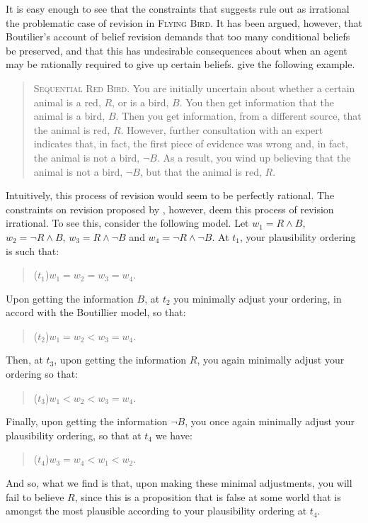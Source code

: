 It is easy enough to see that the constraints that \citet{Boutilier1} suggests rule out as irrational the problematic case of revision in \textsc{Flying Bird}.
It has been argued, however, that Boutilier's account of belief revision demands that too many conditional beliefs be preserved, and that this has undesirable consequences about when an agent may be rationally required to give up certain beliefs. \citet{DarwichePearle} give the following example.
\begin{quote}
\textsc{Sequential Red Bird.}\; You are initially uncertain about whether a certain animal is a red, $R$, or is a bird, $B$.
You then get information that the animal is a bird, $B$.
Then you get information, from a different source, that the animal is red, $R$.
However, further consultation with an expert indicates that, in fact, the first piece of evidence was wrong and, in fact, the animal is not a bird, $\lnot B$.
As a result, you wind up believing that the animal is not a bird, $\lnot B$, but that the animal is red, $R$.
\end{quote}
Intuitively, this process of revision would seem to be perfectly rational.
The constraints on revision proposed by \citet{Boutilier1}, however, deem this process of revision irrational.
To see this, consider the following model.
Let $w_1 = R \wedge B$, $w_2 = \lnot R \wedge B$, $w_3 = R \wedge \lnot B$ and $w_4 =  \lnot R \wedge \lnot B$.
At $t_1$, your plausibility ordering is such that:
\begin{quote}
($t_1$)\quad $w_1 = w_2 = w_3 = w_4$.
\end{quote}
Upon getting the information $B$, at $t_2$ you minimally adjust your ordering, in accord with the Boutillier model, so that: 
\begin{quote}
($t_2$)\quad $w_1 = w_2 < w_3 = w_4$.
\end{quote}
Then, at $t_3$, upon getting the information $R$, you again minimally adjust your ordering so that: 
\begin{quote}
($t_3$)\quad $w_1 < w_2 < w_3 = w_4$.
\end{quote}
Finally, upon getting the information $\lnot B$, you once again minimally adjust your plausibility ordering, so that at $t_4$ we have:
\begin{quote}
($t_4$)\quad $w_3 = w_4 < w_1 < w_2$.
\end{quote}
And so, what we find is that, upon making these minimal adjustments, you will fail to believe $R$, since this is a proposition that is false at some world that is amongst the most plausible according to your plausibility ordering at $t_4$.

